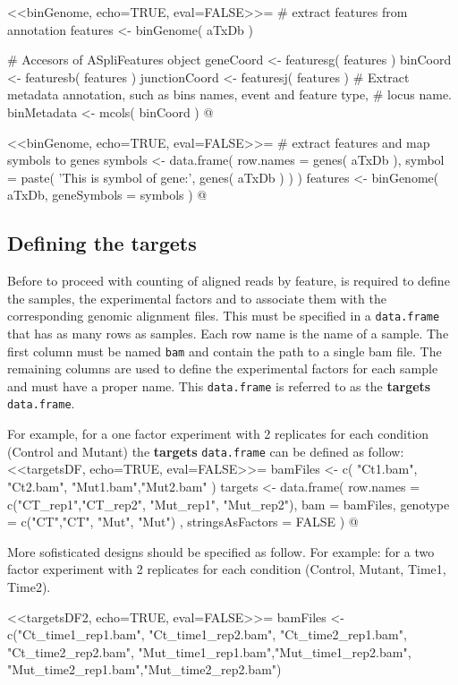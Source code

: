 \documentclass{article}
\begin{document}
<<binGenome, echo=TRUE, eval=FALSE>>=
# extract features from annotation
features      <- binGenome( aTxDb ) 

# Accesors of ASpliFeatures object 
geneCoord     <- featuresg( features )
binCoord      <- featuresb( features )
junctionCoord <- featuresj( features )
# Extract metadata annotation, such as bins names, event and feature type, 
# locus name.  
binMetadata   <- mcols( binCoord )
@

<<binGenome, echo=TRUE, eval=FALSE>>=
# extract features and map symbols to genes
symbols       <- data.frame( row.names = genes( aTxDb ), 
                             symbol = paste( 'This is symbol of gene:',
                                             genes( aTxDb ) ) )
features      <- binGenome( aTxDb, geneSymbols = symbols ) 
@

\subsection{ Defining the targets }
\label{sec:targetsDef}

Before to proceed with counting of aligned reads by feature, is required
to define the samples, the experimental factors and to associate them with the
corresponding genomic alignment files. This must be specified in a 
\texttt{data.frame} that has as many rows as samples. Each row name is the name
of a sample. The first column must be named \texttt{bam} and contain the path to
a single bam file. The remaining columns are used to define the experimental
factors for each sample and must have a proper name. This \texttt{data.frame} is
referred to as the \textbf{targets} \texttt{data.frame}. 

For example, for a one factor experiment with 2 replicates for each condition 
(Control and Mutant) the  \textbf{targets} \texttt{data.frame} can be defined as 
follow:
<<targetsDF, echo=TRUE, eval=FALSE>>=
bamFiles <- c( "Ct1.bam", "Ct2.bam", "Mut1.bam","Mut2.bam" )
targets <- data.frame( row.names =  c("CT_rep1","CT_rep2", "Mut_rep1", "Mut_rep2"),
                       bam = bamFiles,
                       genotype = c("CT","CT", "Mut", "Mut") , 
                       stringsAsFactors = FALSE )
@ 

More sofisticated designs should be specified as follow. For example: for a two
factor experiment with 2 replicates for each condition (Control, Mutant, Time1,
Time2).

<<targetsDF2, echo=TRUE, eval=FALSE>>=
bamFiles <- c("Ct_time1_rep1.bam", "Ct_time1_rep2.bam",
              "Ct_time2_rep1.bam", "Ct_time2_rep2.bam",
              "Mut_time1_rep1.bam","Mut_time1_rep2.bam",
              "Mut_time2_rep1.bam","Mut_time2_rep2.bam")
\end{document}

